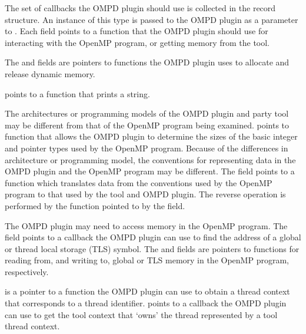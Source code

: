 \descr
The set of callbacks the OMPD plugin should use is collected
in the  record structure.
An instance of this type is passed to the OMPD plugin
as a parameter to .
Each field points to a function that the OMPD plugin should use
for interacting with the OpenMP program, or getting memory from
the tool.

The  and  fields are
pointers to functions the OMPD plugin uses to allocate and release
dynamic memory.

 points to a function that prints a string.

The architectures or programming models of the OMPD plugin and
party tool may be different from that of the OpenMP
program being examined.
 points to function that allows
the OMPD plugin to determine the sizes of the basic integer
and pointer types used by the OpenMP program.
Because of the differences in architecture or programming model,
the conventions for representing data in the OMPD plugin and
the OpenMP program may be different.
The  field points to a function which translates
data from the conventions used by the OpenMP program to that used
by the tool and OMPD plugin.
The reverse operation is performed by the function pointed
to by the  field.

The OMPD plugin may need to access memory in the OpenMP program.
The  field points to a callback the
OMPD plugin can use to find the address of a global or thread
local storage (TLS) symbol.
The  and  fields are
pointers to functions for reading from, and writing to, global or TLS
memory in the OpenMP program, respectively.

 is a pointer to a function
the OMPD plugin can use to obtain a thread context that corresponds to
a thread identifier.
 points to a callback
the OMPD plugin can use to get the tool context that `owns' the
thread represented by a tool thread context.

